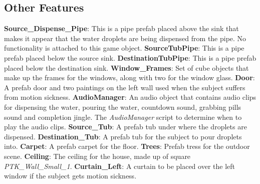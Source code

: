 \documentclass{article}
\begin{document}
\subsection*{Other Features} %
\textbf{Source\_Dispense\_Pipe}: This is a pipe prefab placed above the sink that makes it appear that the water droplets are being dispensed from the pipe. No functionality is attached to this game object.\newline \newline
\textbf{SourceTubPipe}: This is a pipe prefab placed below the source sink.\newline \newline
\textbf{DestinationTubPipe}: This is a pipe prefab placed below the destination sink.\newline \newline
\textbf{Window\_Frames}: Set of cube objects that make up the frames for the windows, along with two for the window glass.\newline \newline
\textbf{Door}: A prefab door and two paintings on the left wall used when the subject suffers from motion sickness.\newline \newline
\textbf{AudioManager}: An audio object that contains audio clips for dispensing the water, pouring the water, countdown sound, grabbing pills sound and completion jingle. The \textit{AudioManager} script to determine when to play the audio clips.\newline \newline
\textbf{Source\_Tub}: A prefab tub under where the droplets are dispensed.\newline \newline
\textbf{Destination\_Tub}: A prefab tub for the subject to pour droplets into.\newline \newline
\textbf{Carpet}: A prefab carpet for the floor.\newline \newline
\textbf{Trees}: Prefab tress for the outdoor scene. \newline \newline
\textbf{Ceiling}: The ceiling for the house, made up of square \textit{PTK\_Wall\_Small\_1}. \newline \newline
\textbf{Curtain\_Left}: A curtain to be placed over the left window if the subject gets motion sickness. \newline \newline
\end{document}
